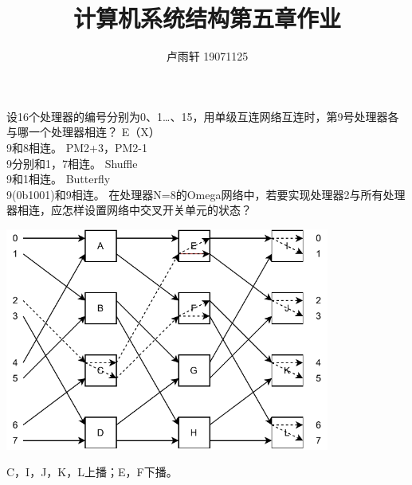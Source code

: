 \documentclass{ctexart}
\title{计算机系统结构第五章作业}
\author{卢雨轩 19071125}
\begin{document}
\maketitle

\begin{outline}[enumerate]
    \1[5-6] 设16个处理器的编号分别为0、1…、15，用单级互连网络互连时，第9号处理器各与哪一个处理器相连？
    \2 E（X）\\
    9和8相连。
    \2 PM2+3，PM2-1 \\
    9分别和1，7相连。
    \2 Shuffle \\
    9和1相连。
    \2 Butterfly \\
    9(0b1001)和9相连。
    \1[5-11] 在处理器N=8的Omega网络中，若要实现处理器2与所有处理器相连，应怎样设置网络中交叉开关单元的状态？
    \begin{center}
        \includegraphics[width=0.8\textwidth]{5-img.pdf}
    \end{center}
    C，I，J，K，L上播；E，F下播。
    
\end{outline}
\end{document}
